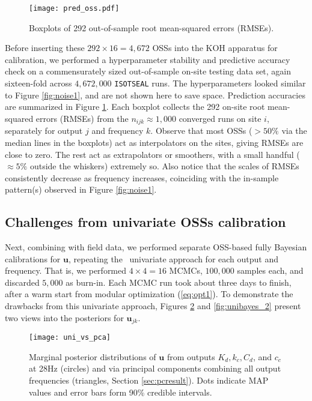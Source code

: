 \documentclass[12pt]{article}
\newcommand{\blu}[1]{\textcolor{black}{#1}} %
\begin{document}
\begin{figure}[ht!]
\centering
\texttt{[image: pred\_oss.pdf]}
\caption{Boxplots of 292 out-of-sample root mean-squared errors (RMSEs).}
\label{fig:rmse}%
\end{figure}

Before inserting these $292 \times 16 = 4{,}672$ OSSs into the KOH apparatus for
calibration, we performed a hyperparameter stability and predictive accuracy
check on a commensurately sized out-of-sample on-site testing data set, again
sixteen-fold across $4{,}672{,}000$ {\tt ISOTSEAL} runs.  The
hyperparameters looked similar to Figure \ref{fig:noise1}, and are not shown
here to save space. Prediction accuracies are summarized in Figure
\ref{fig:rmse}.   Each boxplot collects the 292 on-site root mean-squared
errors (RMSEs) from the $n_{ijk}
\approx 1{,}000$ converged runs on site $i$, separately for output $j$ and
frequency $k$.  Observe that most OSSs ($>50\%$ via the median lines in the
boxplots) act as interpolators on the sites, giving RMSEs are close to zero.
The rest act as extrapolators or smoothers, with a small handful ($\approx
5\%$ outside the whiskers) extremely so. Also notice that the scales of RMSEs
consistently decrease as frequency increases, coinciding with the in-sample
pattern(s) observed in Figure \ref{fig:noise1}.


\subsection{Challenges from univariate OSSs calibration}
\label{sec:challenge}

Next, combining with field data, we performed separate OSS-based fully
Bayesian calibrations for $\mathbf{u}$, repeating the
\citeauthor{Huang:2018}~univariate approach for each output and frequency.
That is, we performed $4 \times 4 = 16$ MCMCs, $100{,}000$ samples each, and
discarded $5{,}000$ as burn-in. Each MCMC run took about three days to finish, 
after a warm start from modular optimization \blu{(\ref{eq:opt1})}. 
To demonstrate the drawbacks from this  univariate approach, Figures
\ref{fig:unibayes} and \ref{fig:unibayes_2} present two views into the
posteriors for $\mathbf{u}_{jk}$.

\begin{figure}[ht!]
\centering
\texttt{[image: uni\_vs\_pca]}
\caption{Marginal posterior distributions of $\mathbf{u}$ 
 from outputs $K_d, k_c, C_d$, and $c_c$  at 28Hz (circles) and
via principal components combining all output frequencies (triangles, Section
\ref{sec:pcresult}). Dots indicate MAP values and error bars form 90\% credible
intervals.}
\label{fig:unibayes}
\end{figure}
\end{document}
